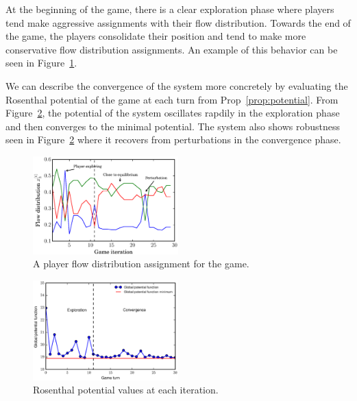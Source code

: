 \documentclass{sig-alternate-ipsn13}
\begin{document}
At the beginning of the game, there is a clear exploration phase where players tend make aggressive assignments with their flow distribution. Towards the end of the game, the players consolidate their position and tend to make more conservative flow distribution assignments. An example of this behavior can be seen in Figure~\ref{fig:player_behavior}.

We can describe the convergence of the system more concretely by evaluating the Rosenthal potential of the game at each turn from Prop~\ref{prop:potential}. From Figure~\ref{fig:global_potential}, the potential of the system oscillates rapdily in the exploration phase and then converges to the minimal potential. The system also shows robustness seen in Figure~\ref{fig:global_potential} where it recovers from perturbations in the convergence phase.


\begin{figure}
  \centering
  \includegraphics[width=0.5\textwidth]{images/player_behavior}
  \caption{A player flow distribution assignment for the game.}
  \label{fig:player_behavior}
\end{figure}

\begin{figure}
  \centering
  \includegraphics[width=0.5\textwidth]{images/global_potential_function}
  \caption{Rosenthal potential values at each iteration.}
  \label{fig:global_potential}
\end{figure}
\end{document}
